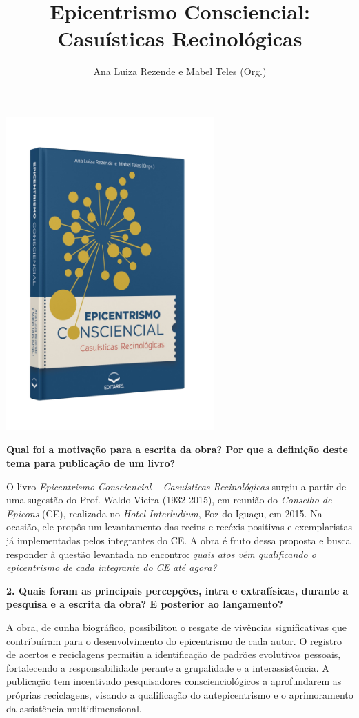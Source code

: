 \documentclass{gescons}
\author{Ana Luiza Rezende e Mabel Teles (Org.)}
\title{Epicentrismo Consciencial: Casuísticas Recinológicas}
\begin{document}
    \makeentrevistatitle

    \begin{multicols}{2}


\begin{center}
    \includegraphics[width=8cm]{articles/entrevista/mockups/Mabel-e-Ana-Luiza.png}
\end{center}

\textbf{Qual foi a motivação para a escrita da obra? Por que a definição deste tema para publicação de um livro?}


O livro \textit{Epicentrismo Consciencial – Casuísticas Recinológicas} surgiu a partir de uma sugestão do Prof. Waldo Vieira (1932-2015), em reunião do \textit{Conselho de Epicons} (CE), realizada no \textit{Hotel Interludium}, Foz do Iguaçu, em 2015. Na ocasião, ele propôs um levantamento das recins e recéxis positivas e exemplaristas já implementadas pelos integrantes do CE. A obra é fruto dessa proposta e busca responder à questão levantada no encontro: \textit{quais atos vêm qualificando o epicentrismo de cada integrante do CE até agora? }

\textbf{2. Quais foram as principais percepções, intra e extrafísicas, durante a pesquisa e a escrita da obra? E posterior ao lançamento?}

A obra, de cunha biográfico, possibilitou o resgate de vivências significativas que contribuíram para o desenvolvimento do epicentrismo de cada autor. O registro de acertos e reciclagens permitiu a identificação de padrões evolutivos pessoais, fortalecendo a responsabilidade perante a grupalidade e a interassistência. A publicação tem incentivado pesquisadores conscienciológicos a aprofundarem as próprias reciclagens, visando a qualificação do autepicentrismo e o aprimoramento da assistência multidimensional.  


\end{multicols}
\end{document}
